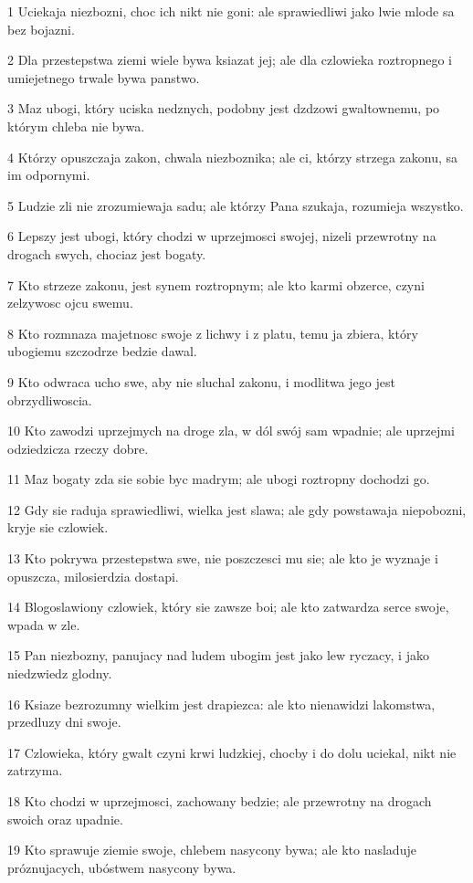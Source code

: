 \par 1 Uciekaja niezbozni, choc ich nikt nie goni: ale sprawiedliwi jako lwie mlode sa bez bojazni.
\par 2 Dla przestepstwa ziemi wiele bywa ksiazat jej; ale dla czlowieka roztropnego i umiejetnego trwale bywa panstwo.
\par 3 Maz ubogi, który uciska nedznych, podobny jest dzdzowi gwaltownemu, po którym chleba nie bywa.
\par 4 Którzy opuszczaja zakon, chwala niezboznika; ale ci, którzy strzega zakonu, sa im odpornymi.
\par 5 Ludzie zli nie zrozumiewaja sadu; ale którzy Pana szukaja, rozumieja wszystko.
\par 6 Lepszy jest ubogi, który chodzi w uprzejmosci swojej, nizeli przewrotny na drogach swych, chociaz jest bogaty.
\par 7 Kto strzeze zakonu, jest synem roztropnym; ale kto karmi obzerce, czyni zelzywosc ojcu swemu.
\par 8 Kto rozmnaza majetnosc swoje z lichwy i z platu, temu ja zbiera, który ubogiemu szczodrze bedzie dawal.
\par 9 Kto odwraca ucho swe, aby nie sluchal zakonu, i modlitwa jego jest obrzydliwoscia.
\par 10 Kto zawodzi uprzejmych na droge zla, w dól swój sam wpadnie; ale uprzejmi odziedzicza rzeczy dobre.
\par 11 Maz bogaty zda sie sobie byc madrym; ale ubogi roztropny dochodzi go.
\par 12 Gdy sie raduja sprawiedliwi, wielka jest slawa; ale gdy powstawaja niepobozni, kryje sie czlowiek.
\par 13 Kto pokrywa przestepstwa swe, nie poszczesci mu sie; ale kto je wyznaje i opuszcza, milosierdzia dostapi.
\par 14 Blogoslawiony czlowiek, który sie zawsze boi; ale kto zatwardza serce swoje, wpada w zle.
\par 15 Pan niezbozny, panujacy nad ludem ubogim jest jako lew ryczacy, i jako niedzwiedz glodny.
\par 16 Ksiaze bezrozumny wielkim jest drapiezca: ale kto nienawidzi lakomstwa, przedluzy dni swoje.
\par 17 Czlowieka, który gwalt czyni krwi ludzkiej, chocby i do dolu uciekal, nikt nie zatrzyma.
\par 18 Kto chodzi w uprzejmosci, zachowany bedzie; ale przewrotny na drogach swoich oraz upadnie.
\par 19 Kto sprawuje ziemie swoje, chlebem nasycony bywa; ale kto nasladuje próznujacych, ubóstwem nasycony bywa.
